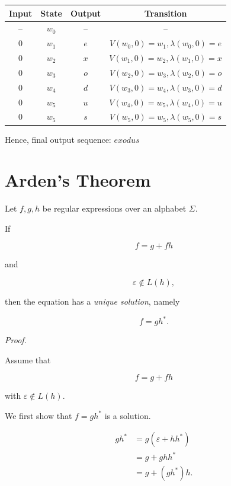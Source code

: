 \documentclass[12pt,a4paper,openany]{article}
\begin{document}
\begin{enumerate}
        \begin{center}
        \begin{tabular}{c|c|c|c}
        \textbf{Input} & \textbf{State} & \textbf{Output} & \textbf{Transition} \\
        \hline
        -- & $w_0$ & -- & -- \\
        $0$ & $w_1$ & $e$ & $V(w_0, 0) = w_1, \lambda(w_0, 0) = e$ \\
        $0$ & $w_2$ & $x$ & $V(w_1, 0) = w_2, \lambda(w_1, 0) = x$ \\
        $0$ & $w_3$ & $o$ & $V(w_2, 0) = w_3, \lambda(w_2, 0) = o$ \\
        $0$ & $w_4$ & $d$ & $V(w_3, 0) = w_4, \lambda(w_3, 0) = d$ \\
        $0$ & $w_5$ & $u$ & $V(w_4, 0) = w_5, \lambda(w_4, 0) = u$ \\
        $0$ & $w_5$ & $s$ & $V(w_5, 0) = w_5, \lambda(w_5, 0) = s$ \\
        \end{tabular}
        \end{center}

    Hence, final output sequence: $\boxed{exodus}$

\end{enumerate}

\section{Arden's Theorem}

Let $f,g,h$ be regular expressions over an alphabet $\Sigma$.

If

\[
f = g + f h
\]

and

\[
\varepsilon \notin L(h),
\]

then the equation has a \emph{unique solution}, namely

\[
f = g h^*.
\]

\emph{Proof.}

Assume that

\[
f = g + f h
\]

with $\varepsilon \notin L(h)$.

We first show that $f = g h^*$ is a solution.

\[
\begin{aligned}
g h^*
&= g(\varepsilon + h h^*) \\
&= g + g h h^* \\
&= g + (g h^*) h.
\end{aligned}
\]
\end{document}
